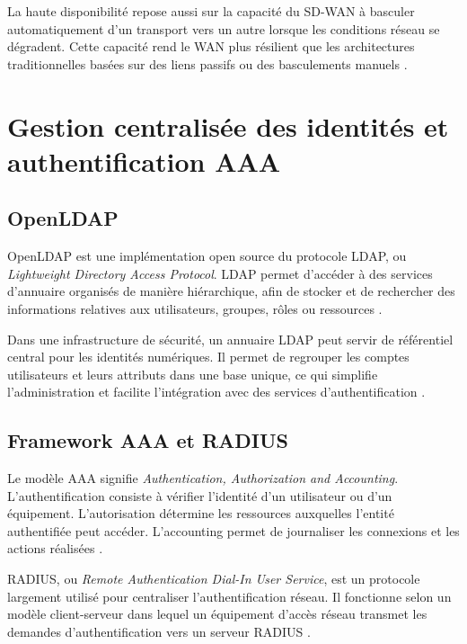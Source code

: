 \documentclass[12pt,a4paper,oneside]{report}
\begin{document}
	La haute disponibilité repose aussi sur la capacité du SD-WAN à basculer automatiquement d'un transport vers un autre lorsque les conditions réseau se dégradent. Cette capacité rend le WAN plus résilient que les architectures traditionnelles basées sur des liens passifs ou des basculements manuels \cite{cisco_sdw_design}.
	
	\section{Gestion centralisée des identités et authentification AAA}
	
	\subsection{OpenLDAP}
	
	OpenLDAP est une implémentation open source du protocole LDAP, ou \textit{Lightweight Directory Access Protocol}. LDAP permet d'accéder à des services d'annuaire organisés de manière hiérarchique, afin de stocker et de rechercher des informations relatives aux utilisateurs, groupes, rôles ou ressources \cite{rfc4511_ldap}.
	
	Dans une infrastructure de sécurité, un annuaire LDAP peut servir de référentiel central pour les identités numériques. Il permet de regrouper les comptes utilisateurs et leurs attributs dans une base unique, ce qui simplifie l'administration et facilite l'intégration avec des services d'authentification \cite{rfc4511_ldap,freeradius_ldap}.
	
	\subsection{Framework AAA et RADIUS}
	
	Le modèle AAA signifie \textit{Authentication, Authorization and Accounting}. L'authentification consiste à vérifier l'identité d'un utilisateur ou d'un équipement. L'autorisation détermine les ressources auxquelles l'entité authentifiée peut accéder. L'accounting permet de journaliser les connexions et les actions réalisées \cite{rfc2865_radius}.
	
	RADIUS, ou \textit{Remote Authentication Dial-In User Service}, est un protocole largement utilisé pour centraliser l'authentification réseau. Il fonctionne selon un modèle client-serveur dans lequel un équipement d'accès réseau transmet les demandes d'authentification vers un serveur RADIUS \cite{rfc2865_radius}.
	
\end{document}
